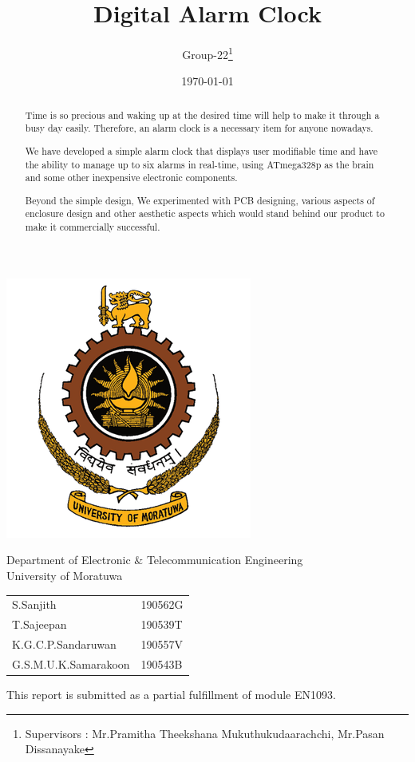 \documentclass[12pt,twocolumn]{article}
\title{Digital Alarm Clock}
\author{Group-22\thanks{Supervisors : Mr.Pramitha Theekshana Mukuthukudaarachchi, Mr.Pasan Dissanayake}}
\date{\today}
\begin{document}
\begin{titlepage}

    \maketitle
    \includegraphics[scale=0.5]{mora}
    \centering

    \begin{center}
        Department of Electronic $\&$ Telecommunication Engineering\\University of Moratuwa\\
    \end{center}


    \begin{center}
        \begin{tabular}{  m{10em}  m{5em} }
            S.Sanjith  & 190562G \\
            T.Sajeepan & 190539T \\
            K.G.C.P.Sandaruwan  & 190557V \\
            G.S.M.U.K.Samarakoon & 190543B \\
        \end{tabular}
    \end{center}


\end{titlepage}

\newpage
\onecolumn
\tableofcontents
\begin{center}
    This report is submitted as a partial fulfillment of module EN1093.
\end{center}


\newpage
\twocolumn
\begin{abstract}
    Time is so precious and waking up at the desired time will help to make it through a
    busy day easily. Therefore, an alarm clock is a necessary item for anyone nowadays. 
    
    We have developed a simple alarm clock that displays user modifiable time and have the ability
    to manage up to six alarms in real-time, using ATmega328p as the brain and some other inexpensive electronic components.

    Beyond the simple design, We experimented with PCB designing, various aspects of enclosure
    design and other aesthetic aspects which would stand behind our product to make it 
    commercially successful.
\end{abstract}
\end{document}
